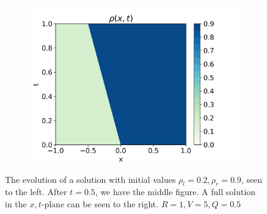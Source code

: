 \documentclass[10pt]{article}
\numberwithin{equation}{section}
\begin{document}
\begin{figure}
     \begin{subfigure}[b]{0.3\textwidth}
         \centering
         \includegraphics[width=\textwidth]{Figures/Model/BackwShockFull.png}
     \end{subfigure}
        \caption{The evolution of a solution with initial values $\rho_l = 0.2, \rho_r = 0.9$, seen to the left. After $t = 0.5$, we have the middle figure. A full solution in the $x,t$-plane can be seen to the right. $R = 1, V = 5, Q = 0.5$}
        \label{fig:ExampleBackwardsShock}
\end{figure}
\end{document}
